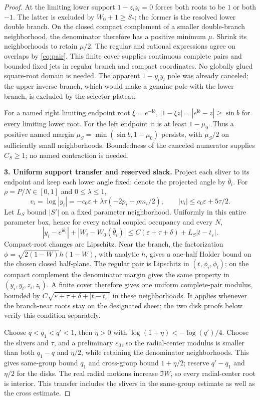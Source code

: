 \documentclass[11pt]{article}
\numberwithin{equation}{section}
\theoremstyle{definition}
\newcommand{\ii}{\mathrm i}
\newcommand{\eps}{\varepsilon}
\begin{document}
\begin{proof}
At the limiting lower support \(1-z_i z_l=0\) forces both
roots to be \(1\) or both \(-1\). The latter is excluded by
\(W_0+1\ge S_*\); the former is the resolved lower double branch.
On the closed compact complement of a smaller double-branch
neighborhood, the denominator therefore has a positive minimum
\(\mu\). Shrink its neighborhoods to retain \(\mu/2\).
The regular and rational expressions agree on overlaps by
\eqref{eq:pair}. This finite cover supplies continuous complete
pairs and bounded fixed jets in regular branch and compact
coordinates. No globally glued square-root domain is needed.
The apparent \(1-y_i y_l\) pole was already canceled; the upper
inverse branch, which would make a genuine pole with the lower
branch, is excluded by the selector plateau.

For a named right limiting endpoint root \(\xi=e^{-\ii b}\),
\(|1-\xi z|=|e^{\ii b}-z|\ge\sin b\) for every limiting lower
root. For the left endpoint it is at least \(1-\mu_0\).
Thus a positive named margin
\(\mu_S=\min(\sin b,1-\mu_0)\) persists, with \(\mu_S/2\)
on sufficiently small neighborhoods. Boundedness of the canceled
numerator supplies \(C_S\ge1\); no named contraction is needed.

\par\smallskip\noindent\textbf{3. Uniform support transfer and reserved slack.}
Project each sliver to its endpoint and keep each lower angle
fixed; denote the projected angle by \(\bar\theta_i\).
For \(\rho=P/N\in[0,1]\) and \(0\le\lambda\le1\),
\[
 v_i=\log|y_i|=-c_0\eps+\lambda\tau(-2p_i+\rho m_i/2),
 \qquad |v_i|\le c_0\eps+5\tau/2.
\]
Let \(L_S\) bound \(|S'|\) on a fixed parameter neighborhood.
Uniformly in this entire parameter box, hence for every actual
coupled occupancy and every \(N\),
\[
 |y_i-e^{\ii\bar\theta_i}|+|W_i-W_0(\bar\theta_i)|
 \le C(\eps+\tau+\delta)+L_S|t-t_\eps|.
\]
Compact-root changes are Lipschitz. Near the branch, the factorization
\(\phi=\sqrt{2(1-W)}h(1-W)\), with analytic \(h\), gives a
one-half Holder bound on the chosen closed half-plane.
The regular pair is Lipschitz in \((t,\phi_i,\phi_l)\);
on the compact complement the denominator margin gives the same
property in \((y_i,y_l,z_i,z_l)\). A finite cover therefore gives
one uniform complete-pair modulus, bounded by
\(C\sqrt{\eps+\tau+\delta+|t-t_\eps|}\) in these neighborhoods.
It applies whenever the branch-near roots stay on the designated
sheet; the two disk proofs below verify this condition separately.

Choose \(q<q_1<q'<1\), then \(\eta>0\) with
\(\log(1+\eta)<-\log(q')/4\).
Choose the slivers and \(\tau\), and a preliminary \(\eps_0\),
so the radial-center modulus is smaller than both \(q_1-q\)
and \(\eta/2\), while retaining the denominator neighborhoods.
This gives same-group bound \(q_1\) and cross-group bound
\(1+\eta/2\); reserve \(q'-q_1\) and \(\eta/2\) for the disks.
The real radial motions increase \(\Im W\), so every radial-center
root is interior. This transfer includes the slivers in the
same-group estimate as well as the cross estimate.


\end{proof}
\end{document}
